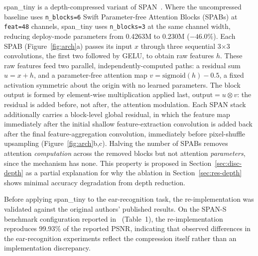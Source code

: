 \documentclass[pdflatex,sn-vancouver-num]{sn-jnl}
\begin{document}
span\_tiny is a depth-compressed variant of SPAN~\cite{wan2024span}. Where the uncompressed baseline uses \texttt{n\_blocks=6} Swift Parameter-free Attention Blocks (SPABs) at \texttt{feat=48} channels, span\_tiny uses \texttt{n\_blocks=3} at the same channel width, reducing deploy-mode parameters from 0.4263M to 0.230M ($-46.0\%$). Each SPAB (Figure~\ref{fig:arch}a) passes its input $x$ through three sequential 3$\times$3 convolutions, the first two followed by GELU, to obtain raw features $h$. These raw features feed two parallel, independently-computed paths: a residual sum $u = x + h$, and a parameter-free attention map $v = \mathrm{sigmoid}(h) - 0.5$, a fixed activation symmetric about the origin with no learned parameters. The block output is formed by element-wise multiplication applied last, $\text{output} = u \otimes v$: the residual is added before, not after, the attention modulation. Each SPAN stack additionally carries a block-level global residual, in which the feature map immediately after the initial shallow feature-extraction convolution is added back after the final feature-aggregation convolution, immediately before pixel-shuffle upsampling (Figure~\ref{fig:arch}b,c). Halving the number of SPABs removes attention \emph{computation} across the removed blocks but not attention \emph{parameters}, since the mechanism has none. This property is proposed in Section~\ref{sec:disc-depth} as a partial explanation for why the ablation in Section~\ref{sec:res-depth} shows minimal accuracy degradation from depth reduction.

Before applying span\_tiny to the ear-recognition task, the re-implementation was validated against the original authors' published results. On the SPAN-S benchmark configuration reported in~\cite{wan2024span} (Table~1), the re-implementation reproduces 99.93\% of the reported PSNR, indicating that observed differences in the ear-recognition experiments reflect the compression itself rather than an implementation discrepancy.
\end{document}
